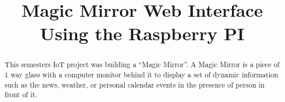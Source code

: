 \documentclass[conference]{IEEEtran}
\begin{document}
%
\title{Magic Mirror Web Interface\\ Using the Raspberry PI}

\author{
\and
{}
\and
{}
}



\maketitle

\begin{abstract}
This semesters IoT project was building a “Magic Mirror”. 
A Magic Mirror is a piece of 1 way glass with a computer monitor behind it to display a set of dynamic information such as the news, weather, or personal calendar events in the presence of person in front of it.
\end{abstract}
\end{document}

